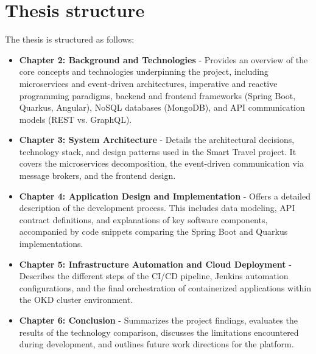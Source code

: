 \clearpage
\section[Thesis structure]{Thesis structure}

The thesis is structured as follows:
\begin{itemize}
    \item \textbf{Chapter 2: Background and Technologies} - Provides an overview of the core concepts and technologies underpinning the project, including microservices and event-driven architectures, imperative and reactive programming paradigms, backend and frontend frameworks (Spring Boot, Quarkus, Angular), NoSQL databases (MongoDB), and API communication models (REST vs. GraphQL).
    \item \textbf{Chapter 3: System Architecture} - Details the architectural decisions, technology stack, and design patterns used in the Smart Travel project. It covers the microservices decomposition, the event-driven communication via message brokers, and the frontend design.
    \item \textbf{Chapter 4: Application Design and Implementation} - Offers a detailed description of the development process. This includes data modeling, API contract definitions, and explanations of key software components, accompanied by code snippets comparing the Spring Boot and Quarkus implementations.
    \item \textbf{Chapter 5: Infrastructure Automation and Cloud Deployment} - Describes the different steps of the CI/CD pipeline, Jenkins automation configurations, and the final orchestration of containerized applications within the OKD cluster environment.
    \item \textbf{Chapter 6: Conclusion} - Summarizes the project findings, evaluates the results of the technology comparison, discusses the limitations encountered during development, and outlines future work directions for the platform.
\end{itemize}